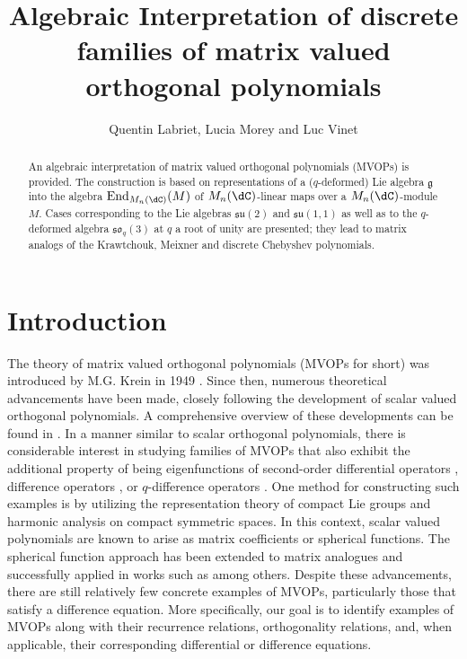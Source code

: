 \documentclass[a4paper,reqno]{amsart}
\title[Algebraic Interpretation of discrete MVOPs]{Algebraic Interpretation of discrete families of matrix valued orthogonal polynomials}
\author{Quentin Labriet, Lucia Morey and Luc Vinet}
\DeclareMathOperator\End{ End}
\theoremstyle{definition}
\numberwithin{equation}{section}
\begin{document}
\begin{abstract}
An algebraic interpretation of matrix valued orthogonal polynomials (MVOPs) is provided. The construction is based on representations of a ($q$-deformed) Lie algebra $\mathfrak{g}$ into the algebra $\End_{M_n(\dC)}(M)$ of $M_n(\dC)$-linear maps over a $M_n(\dC)$-module $M$. Cases corresponding to the Lie algebras $\mathfrak{su}(2)$ and $\mathfrak{su}(1, 1)$ as well as to the $q$-deformed algebra $\mathfrak{so}_q(3)$ at $q$ a root of unity are presented; they lead to matrix analogs of the Krawtchouk, Meixner and discrete Chebyshev polynomials.
\end{abstract}

\maketitle

\section{Introduction}
The theory of matrix valued orthogonal polynomials (MVOPs for short) was introduced by M.G. Krein in 1949 \cite{Krein1}. Since then, numerous theoretical advancements have been made, closely following the development of scalar valued orthogonal polynomials. A comprehensive overview of these developments can be found in \cite{DamanikPushnitskiSimon08}. In a manner similar to scalar orthogonal polynomials, there is considerable interest in studying families of MVOPs that also exhibit the additional property of being eigenfunctions of second-order differential operators \cite{DurandlI2008_2,DuranG1,GrunbaumPacharoniTirao02,KoelinkRiosRoman17}, difference operators \cite{ALVAREZNODARSE201340,DURAN2012586,EMR}, or $q$-difference operators \cite{ALDENHOVEN2015164,AKR1}.  One method for constructing such examples is by utilizing the representation theory of compact Lie groups and harmonic analysis on compact symmetric spaces. In this context, scalar valued polynomials are known to arise as matrix coefficients or spherical functions. The spherical function approach has been extended to matrix analogues and successfully applied in works such as \cite{GrunbaumPacharoniTirao02,HeckmanVP,KvPR1,KvPR2} among  others. Despite these advancements, there are still relatively few concrete examples of MVOPs, particularly those that satisfy a difference equation. More specifically, our goal is to identify examples of MVOPs along with their recurrence relations, orthogonality relations, and, when applicable, their corresponding differential or difference equations. 
\end{document}
